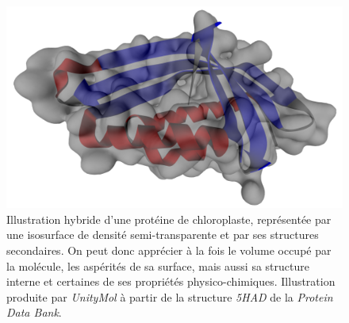 	\begin{figure}[H]
		\centering
		\includegraphics[width=\textwidth]{figures/ch1/transSS}
		\caption[Surface semi-transparente et structures secondaires.]{Illustration hybride d'une protéine de chloroplaste, représentée par une isosurface de densité semi-transparente et par ses structures secondaires. On peut donc apprécier à la fois le volume occupé par la molécule, les aspérités de sa surface, mais aussi sa structure interne et certaines de ses propriétés physico-chimiques. Illustration produite par \emph{UnityMol} à partir de la structure \emph{5HAD} de la \emph{Protein Data Bank}.}
		\label{fig:transSS}
	\end{figure}
	

		
	
